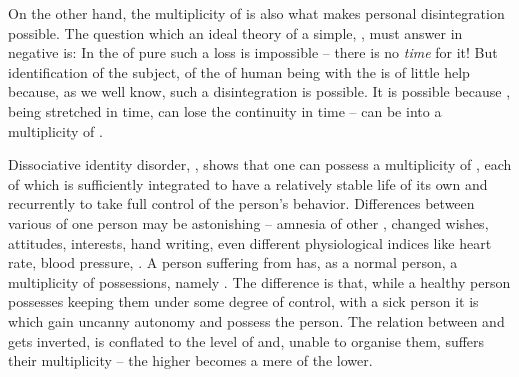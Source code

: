 
\pa\label{pa:egoDID} On the other hand, the multiplicity of  is also
what makes personal disintegration possible.  The question which an ideal theory
of a simple, ,   must answer in
negative is:   In the  of pure
 such a loss is impossible -- there is no {\em time} for it!
But identification of the subject, of the  of human being with the
 is of little help because, as we well know, such a
disintegration is possible. It is possible because , being stretched in
time, can lose the continuity in time --  can be  into a
multiplicity of .

Dissociative identity disorder, , shows that one can possess a
multiplicity of , each of which is sufficiently integrated to have a
relatively stable life of its own and recurrently to take full control of the
person's behavior.  Differences between various  of one
person may be astonishing -- amnesia of other , changed wishes,
attitudes, interests, hand writing, even different physiological indices like
heart rate, blood pressure, . A person
suffering from  has, as a normal person, a multiplicity of possessions,
namely . The difference is that, while a healthy person possesses
 keeping them under some degree of control, with a sick person it is
 which gain uncanny autonomy and possess the person. The relation
between  and  gets inverted,  is conflated to the level of
 and, unable to organise them, suffers their multiplicity -- the higher
becomes a mere  of the lower.

